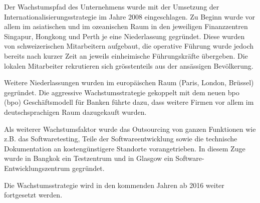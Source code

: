 \begin{sloppypar}
Der Wachstumspfad des Unternehmens wurde mit der Umsetzung der Internationalisierungsstrategie im Jahre 2008 eingeschlagen. Zu Beginn wurde vor allem im asiatischen und im ozeanischen Raum in den jeweiligen Finanzzentren Singapur, Hongkong und Perth je eine Niederlassung gegründet. Diese wurden von schweizerischen Mitarbeitern aufgebaut, die operative Führung wurde jedoch bereits nach kurzer Zeit an jeweils einheimische Führungskräfte übergeben. Die lokalen Mitarbeiter rekrutieren sich grösstenteils aus der ansässigen Bevölkerung.
\end{sloppypar}

\begin{sloppypar}
Weitere Niederlassungen wurden im europäischen Raum (Paris, London, Brüssel) gegründet. Die aggressive Wachstumsstrategie gekoppelt mit dem neuen \acrshort{bpo} (\acrlong{bpo}) Geschäftsmodell für Banken führte dazu, dass weitere Firmen vor allem im deutschsprachigen Raum dazugekauft wurden.
\end{sloppypar}

\begin{sloppypar}
Als weiterer Wachstumsfaktor wurde das Outsourcing von ganzen Funktionen wie z.B. das Softwaretesting, Teile der Softwareentwicklung sowie die technische Dokumentation an kostengünstigere Standorte vorangetrieben. In diesem Zuge wurde in Bangkok ein Testzentrum und in Glasgow ein Software-Entwicklungszentrum gegründet.
\end{sloppypar}

\begin{sloppypar}
Die Wachstumsstrategie wird in den kommenden Jahren ab 2016 weiter fortgesetzt werden.
\end{sloppypar}